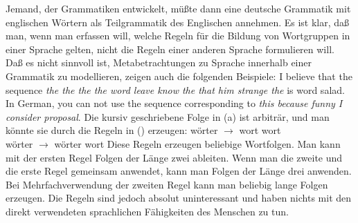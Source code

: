 Jemand, der Grammatiken entwickelt, müßte dann eine deutsche Grammatik mit englischen Wörtern
als Teilgrammatik des Englischen annehmen. Es ist klar, daß man, wenn man erfassen will, welche
Regeln für die Bildung von Wortgruppen in einer Sprache gelten, nicht die Regeln einer anderen
Sprache formulieren will. Daß es nicht sinnvoll ist, Metabetrachtungen zu Sprache innerhalb
einer Grammatik zu modellieren, zeigen auch die folgenden Beispiele:
\eal
\ex I believe that the sequence \emph{the the the the word leave know the that him strange the} is word salad.
\ex In German, you can not use the sequence corresponding to \emph{this because funny I consider proposal}.
\zl
Die kursiv geschriebene Folge in (a) ist arbiträr, und man könnte sie durch die Regeln in () erzeugen:
\ea
wörter $\to$ wort wort\\
wörter $\to$ wörter wort
\z
Diese Regeln erzeugen beliebige Wortfolgen. Man kann mit der ersten Regel Folgen der Länge zwei
ableiten. Wenn man die zweite und die erste Regel gemeinsam anwendet, kann man Folgen der Länge drei
anwenden. Bei Mehrfachverwendung der zweiten Regel kann man beliebig lange Folgen erzeugen.
Die Regeln sind jedoch absolut uninteressant und 
haben nichts mit den direkt verwendeten sprachlichen Fähigkeiten des Menschen zu tun.

